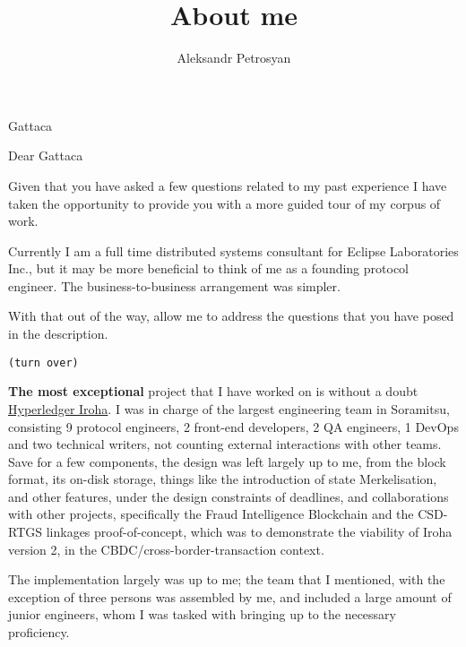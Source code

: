 \documentclass[
    12pt,
    a4paper,
    subject=titled,
    parskip=half,
    firsthead=true,
    fromalign=right,
    fromemail=true,
    fromurl=true,
    frommobilephone=true,
    backaddress=true,
]{scrlttr2}
\author{Aleksandr Petrosyan}
\title{About me}
\begin{document}
\begin{letter}{Gattaca}
\opening{Dear Gattaca}
Given that you have asked a few questions related to my past
experience I have taken the opportunity to provide you with a more
guided tour of my corpus of work.

Currently I am a full time distributed systems consultant for Eclipse
Laboratories Inc., but it may be more beneficial to think of me as a
founding protocol engineer. The business-to-business arrangement was
simpler.

With that out of the way, allow me to address the questions that you
have posed in the description.

\vfill
\begin{center}
\texttt{(turn over)}
\end{center}
\vfill
\pagebreak

\textbf{The most exceptional} project that I have worked on is without
a doubt \href{https://hyperledger.org/use/iroha/}{Hyperledger
  Iroha}. I was in charge of the largest engineering team in
Soramitsu, consisting 9 protocol engineers, 2 front-end developers, 2
QA engineers, 1 DevOps and two technical writers, not counting
external interactions with other teams.  Save for a few components,
the design was left largely up to me, from the block format, its
on-disk storage, things like the introduction of state Merkelisation,
and other features, under the design constraints of deadlines, and
collaborations with other projects, specifically the Fraud
Intelligence Blockchain and the CSD-RTGS linkages proof-of-concept,
which was to demonstrate the viability of Iroha version 2, in the
CBDC/cross-border-transaction context.

The implementation largely was up to me; the team that I mentioned,
with the exception of three persons was assembled by me, and included
a large amount of junior engineers, whom I was tasked with bringing up
to the necessary proficiency.


\end{letter}
\end{document}
